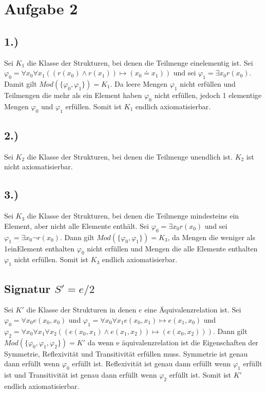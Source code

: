 \section*{Aufgabe 2}

\subsection*{1.)}

Sei $K_1$ die Klasse der Strukturen, bei denen die Teilmenge einelementig ist.
Sei $\varphi_0 = \forall x_0 \forall x_1 ( (r(x_0) \wedge r(x_1)) \mapsto (x_0 \doteq x_1) )$ und sei $\varphi_1 = \exists x_0 r(x_0)$. Damit gilt $Mod(\{ \varphi_0 , \varphi_1 \})=K_1 $. Da leere Mengen $\varphi_1$ nicht erfüllen und Teilmengen die mehr als ein Element haben $\varphi_0$ nicht erfüllen, jedoch 1 elementige Mengen $\varphi_0$ und $\varphi_1$ erfüllen. Somit ist $K_1$ endlich axiomatisierbar.


\subsection*{2.)}
Sei $K_2$ die Klasse der Strukturen, bei denen die Teilmenge unendlich ist.
$K_2$ ist nicht axiomatisierbar.

\subsection*{3.)}
Sei $K_3$ die Klasse der Strukturen, bei denen die Teilmenge mindesteins ein Element, aber nicht alle Elemente enthält. Sei $\varphi_0 = \exists x_0 r(x_0)$ und sei $\varphi_1 = \exists x_0 \neg r(x_0)$. Dann gilt $Mod(\{ \varphi_0 , \varphi_ 1 \})= K_3$, da Mengen die weniger als 1einElement enthalten $\varphi_0$ nicht erfüllen und Mengen die alle Elemente enthalten $\varphi_1$ nicht erfüllen. Somit ist $K_3$ endlich axiomatisierbar.

\subsection*{Signatur $S'={e/2}$}

Sei $K'$ die Klasse der Strukturen in denen $e$ eine Äquivalenzrelation ist.
 Sei $\varphi_0 = \forall x_0 e(x_0,x_0)$ und $\varphi_1=\forall x_0 \forall x_1 e(x_0,x_1) \mapsto e(x_1,x_0)$ und $\varphi_2= \forall x_0 \forall x_1 \forall x_2 ((e(x_0,x_1)\wedge e(x_1,x_2))\mapsto(e(x_0,x_2)))$. Dann gilt $Mod(\{ \varphi_0, \varphi_1, \varphi_2\})=K'$ da wenn e äquivalenzrelation ist die Eigenschaften der Symmetrie, Reflexivität und Transitivität erfüllen muss. Symmetrie ist genau dann erfüllt wenn $\varphi_0$ erfüllt ist. Reflexivität ist genau dann erfüllt wenn $\varphi_1$ erfüllt ist und Transitivität ist genau dann erfüllt wenn $\varphi_2$ erfüllt ist. Somit ist $K'$ endlich axiomatisierbar.